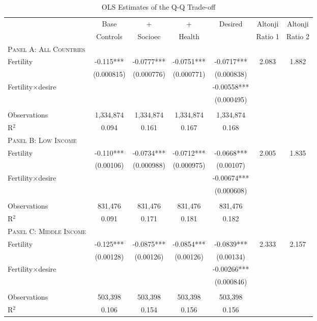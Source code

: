 \begin{landscape}\begin{table}[!htbp] \centering 
\caption{OLS Estimates of the Q-Q Trade-off} 
 \vspace{4mm}\label{TWINtab:OLS} 
\begin{tabular}{lcccccc} \toprule \toprule 
&Base&+&+&Desired&Altonji&Altonji\\
&Controls&Socioec&Health&&Ratio 1&Ratio 2\\\midrule
\textsc{Panel A: All Countries}&&&&&&\\
Fertility &-0.115***&-0.0777***&-0.0751***&-0.0717***&2.083&1.882\\
&(0.000815)&(0.000776)&(0.000771)&(0.000838)&&\\
Fertility$\times$desire&&&&-0.00558***&&\\
&&&&(0.000495)&&\\
&&&&&&\\
Observations &1,334,874&1,334,874&1,334,874&1,334,874&&\\
R$^2$&0.094&0.161&0.167&0.168&&\\\midrule
\textsc{Panel B: Low Income}&&&&&&\\
Fertility &-0.110***&-0.0734***&-0.0712***&-0.0668***&2.005&1.835\\
&(0.00106)&(0.000988)&(0.000975)&(0.00107)&&\\
Fertility$\times$desire&&&&-0.00674***&&\\
&&&&(0.000608)&&\\
&&&&&&\\
Observations &831,476&831,476&831,476&831,476&&\\
R$^2$&0.091&0.171&0.181&0.182&&\\\midrule
\textsc{Panel C: Middle Income}&&&&&&\\
Fertility &-0.125***&-0.0875***&-0.0854***&-0.0839***&2.333&2.157\\
&(0.00128)&(0.00126)&(0.00126)&(0.00134)&&\\
Fertility$\times$desire&&&&-0.00266***&&\\
&&&&(0.000846)&&\\
&&&&&&\\
Observations &503,398&503,398&503,398&503,398&&\\
R$^2$&0.106&0.154&0.156&0.156&&\\\hline\hline

\end{tabular}
\end{table}
\end{landscape}
